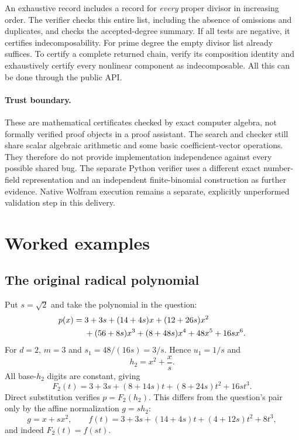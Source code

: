\documentclass[11pt,a4paper]{article}
\numberwithin{equation}{section}
\theoremstyle{definition}
\theoremstyle{remark}
\begin{document}
An exhaustive record includes a record for \emph{every} proper divisor in
increasing order. The verifier checks this entire list, including the absence
of omissions and duplicates, and checks the accepted-degree summary. If all
tests are negative, it certifies indecomposability. For prime degree the
empty divisor list already suffices. To certify a complete returned chain,
verify its composition identity and exhaustively certify every nonlinear
component as indecomposable. All this can be done through the public API.

\paragraph{Trust boundary.}
These are mathematical certificates checked by exact computer algebra, not
formally verified proof objects in a proof assistant. The search and checker
still share scalar algebraic arithmetic and some basic coefficient-vector
operations. They therefore do not provide implementation independence against
every possible shared bug. The separate Python verifier uses a different
exact number-field representation and an independent finite-binomial
construction as further evidence. Native Wolfram execution remains a separate,
explicitly unperformed validation step in this delivery.

\section{Worked examples}
\label{sec:examples}
\subsection{The original radical polynomial}
Put $s=\sqrt2$ and take the polynomial in the question:
\begin{align}
 p(x)={}&3+3s+(14+4s)x+(12+26s)x^2\notag\\
        &+(56+8s)x^3+(8+48s)x^4+48x^5+16s x^6.
 \label{eq:original}
\end{align}
For $d=2$, $m=3$ and $s_1=48/(16s)=3/s$. Hence $u_1=1/s$ and
\begin{equation}
 h_2=x^2+\frac{x}{s}.
 \label{eq:originalh}
\end{equation}
All base-$h_2$ digits are constant, giving
\begin{equation}
 F_2(t)=3+3s+(8+14s)t+(8+24s)t^2+16s t^3.
 \label{eq:originalF}
\end{equation}
Direct substitution verifies $p=F_2(h_2)$. This differs from the question's
pair only by the affine normalization $g=s h_2$:
\[
 g=x+s x^2,\qquad
 f(t)=3+3s+(14+4s)t+(4+12s)t^2+8t^3,
\]
and indeed $F_2(t)=f(st)$.
\end{document}

